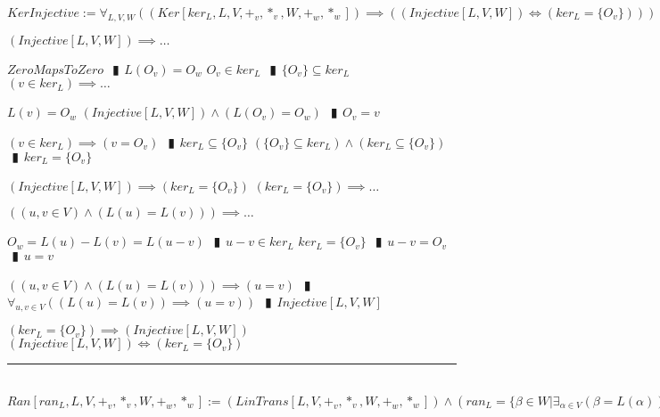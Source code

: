 \documentclass{book}
\newcommand{\abr}{:=}
\newcommand{\pipe}{$\phantom{(}\vrectangleblack\phantom{)}$}
\newcommand{\pr}[1]{\left(#1\right)}
\begin{document}
$KerInjective \abr \forall_{L, V, W}\pr{(Ker[ker_L, L, V, +_v, *_v, W, +_w, *_w]) \implies \pr{(Injective[L, V, W]) \iff (ker_L = \{O_v\})}}$
\begin{enumerate}
  \lit $(Injective[L, V, W]) \implies \ldots$
  \begin{enumerate}
    \lit $ZeroMapsToZero$ \pipe $L(O_v) = O_w$
    \lit $O_v \in ker_L$ \pipe $\{O_v\} \subseteq ker_L$
    \lit $(v \in ker_L) \implies \ldots$
    \begin{enumerate}
      \lit $L(v) = O_w$
      \lit $(Injective[L, V, W]) \land \pr{L(O_v) = O_w}$ \pipe $O_v = v$
    \end{enumerate}
    \lit $(v \in ker_L) \implies (v = O_v)$ \pipe $ker_L \subseteq \{O_v\}$
    \lit $(\{O_v\} \subseteq ker_L) \land (ker_L \subseteq \{O_v\})$ \pipe $ker_L = \{O_v\}$
  \end{enumerate}
  \lit $(Injective[L, V, W]) \implies (ker_L = \{O_v\})$
  \lit $(ker_L = \{O_v\}) \implies \ldots$
  \begin{enumerate}
    \lit $\pr{(u, v \in V) \land \pr{L(u) = L(v)}} \implies \ldots$
    \begin{enumerate}
      \lit $O_w = L(u) - L(v) = L(u - v)$ \pipe $u - v \in ker_L$
      \lit $ker_L = \{O_v\}$ \pipe $u - v = O_v$ \pipe $u = v$
    \end{enumerate}
    \lit $\pr{(u, v \in V) \land \pr{L(u) = L(v)}} \implies (u = v)$ \pipe $\forall_{u, v \in V}\pr{\pr{L(u) = L(v)} \implies (u = v)}$ \pipe $Injective[L, V, W]$
  \end{enumerate}
  \lit $(ker_L = \{O_v\}) \implies (Injective[L, V, W])$
  \lit $(Injective[L, V, W]) \iff (ker_L = \{O_v\})$
\end{enumerate} \vspace{.75mm} \hrule \vspace{.75mm} \ \\ 

$Ran[ran_L, L, V, +_v, *_v, W, +_w, *_w] \abr (LinTrans[L, V, +_v, *_v, W, +_w, *_w]) \land \pr{ran_L = \{\beta \in W | \exists_{\alpha \in V}\pr{\beta = L(\alpha)}\}}$ \\
\end{document}
